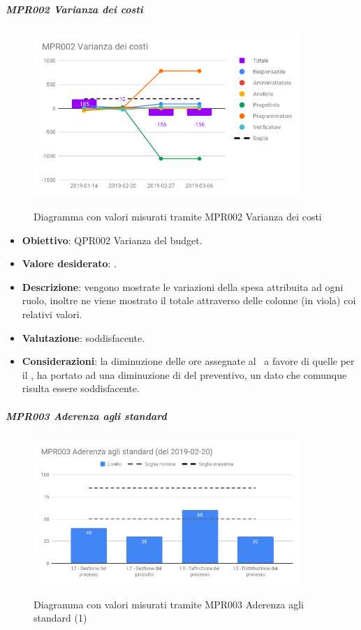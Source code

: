 	\subparagraph{MPR002 Varianza dei costi}

	\begin{figure}[H]
		\centering
		\includegraphics[width=0.9\textwidth]{img/cruscotti/MPR002.png}
		\label{immagineVarianzaCosti}
		\caption{Diagramma con valori misurati tramite MPR002 Varianza dei costi}
	\end{figure}

	\begin{itemize}
		\item \textbf{Obiettivo}: QPR002 Varianza del budget.
		\item \textbf{Valore desiderato}: .
		\item \textbf{Descrizione}: vengono mostrate le variazioni della spesa attribuita ad ogni ruolo, inoltre ne viene mostrato il totale attraverso delle colonne (in viola) coi relativi valori.
		\item \textbf{Valutazione}: soddisfacente.
		\item \textbf{Considerazioni}: la diminuzione delle ore assegnate al \Prog\ a favore di quelle per il \Progr, ha portato ad una diminuzione di  del preventivo, un dato che comunque risulta essere soddisfacente.
	\end{itemize}
	

	\subparagraph{MPR003 Aderenza agli standard}

	\begin{figure}[H]
		\centering
		\includegraphics[width=0.9\textwidth]{img/cruscotti/MPR003_(1).png}
		\label{immagineAderenzaStandard1}
		\caption{Diagramma con valori misurati tramite MPR003 Aderenza agli standard (1)}
	\end{figure}

